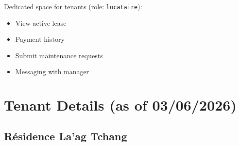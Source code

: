 \documentclass[a4paper,11pt]{article}
\begin{document}
Dedicated space for tenants (role: \texttt{locataire}):
\begin{itemize}
  \item View active lease
  \item Payment history
  \item Submit maintenance requests
  \item Messaging with manager
\end{itemize}

\section{Tenant Details (as of 03/06/2026)}

\subsection{Résidence La'ag Tchang}
\end{document}
